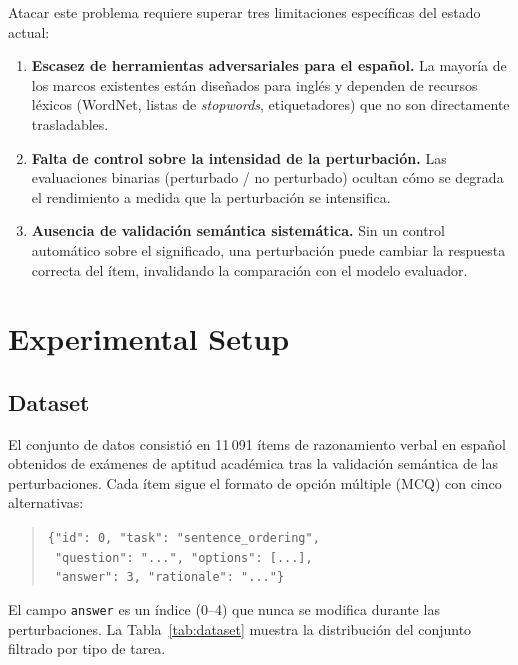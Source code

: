 \documentclass[11pt]{article}
\begin{document}
Atacar este problema requiere superar tres limitaciones específicas del
estado actual:

\begin{enumerate}
    \item \textbf{Escasez de herramientas adversariales para el español.}
          La mayoría de los marcos existentes están diseñados para inglés y
          dependen de recursos léxicos (WordNet, listas de \textit{stopwords},
          etiquetadores) que no son directamente trasladables.
    \item \textbf{Falta de control sobre la intensidad de la perturbación.}
          Las evaluaciones binarias (perturbado / no perturbado) ocultan
          cómo se degrada el rendimiento a medida que la perturbación se
          intensifica.
    \item \textbf{Ausencia de validación semántica sistemática.}
          Sin un control automático sobre el significado, una perturbación
          puede cambiar la respuesta correcta del ítem, invalidando la
          comparación con el modelo evaluador.
\end{enumerate}

\section{Experimental Setup}
\label{sec:setup}

\subsection{Dataset}
\label{sec:dataset}

El conjunto de datos consistió en 11\,091 ítems de razonamiento
verbal en español obtenidos de exámenes de aptitud académica tras la validación
semántica de las perturbaciones.
Cada ítem sigue el formato de opción múltiple (MCQ) con cinco alternativas:

\begin{quote}
\small
\texttt{\{"id": 0, "task": "sentence\_ordering",}\\
\texttt{\ "question": "...", "options": [...],}\\
\texttt{\ "answer": 3, "rationale": "..."\}}
\end{quote}

El campo \texttt{answer} es un índice (0–4) que nunca se modifica durante las
perturbaciones.
La Tabla~\ref{tab:dataset} muestra la distribución del conjunto filtrado por tipo de tarea.
\end{document}
